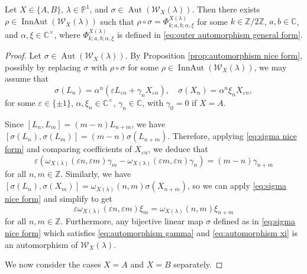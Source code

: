 \documentclass[10pt,a4paper]{amsart}
\DeclareMathOperator{\Aut}{Aut}
\DeclareMathOperator{\InnAut}{InnAut}
\newcommand{\CC}{\mathbb{C}}
\newcommand{\PP}{\mathbb{P}}
\newcommand{\W}{\mathcal{W}}
\newcommand{\ZZ}{\mathbb{Z}}
\begin{document}
\begin{proposition}\label{prop:outer automorphisms}
    Let $X \in \{A,B\}$, $\lambda \in \PP^1$, and $\sigma \in \Aut(\W_X(\lambda))$. Then there exists $\rho \in \InnAut(\W_X(\lambda))$ such that $\rho \circ \sigma = \Phi_{k;a,b;\alpha,\xi}^{X(\lambda)}$ for some $k \in \ZZ/2\ZZ$, $a,b \in \CC$, and $\alpha, \xi \in \CC^\times$, where $\Phi_{k;a,b;\alpha,\xi}^{X(\lambda)}$ is defined in \eqref{eq:outer automorphism general form}.

\end{proposition}

\begin{proof}
    Let $\sigma \in \Aut(\W_X(\lambda))$. By Proposition \ref{prop:automorphism nice form}, possibly by replacing $\sigma$ with $\rho \circ \sigma$ for some $\rho \in \InnAut(\W_X(\lambda))$, we may assume that
    \begin{equation}\label{eq:sigma nice form}
        \sigma(L_n) = \alpha^n (\varepsilon L_{\varepsilon n} + \gamma_n X_{\varepsilon n}), \quad \sigma(X_n) = \alpha^n \xi_n X_{\varepsilon n},
    \end{equation}
    for some $\varepsilon \in \{\pm 1\}$, $\alpha, \xi_n \in \CC^\times$, $\gamma_n \in \CC$, with $\gamma_0 = 0$ if $X = A$.

    Since $[L_n,L_m] = (m - n)L_{n+m}$, we have $[\sigma(L_n),\sigma(L_m)] = (m - n)\sigma(L_{n+m})$. Therefore, applying \eqref{eq:sigma nice form} and comparing coefficients of $X_{\varepsilon n}$, we deduce that
    \begin{equation}\label{eq:automorphism gamma}
        \varepsilon(\omega_{X(\lambda)}(\varepsilon n, \varepsilon m)\gamma_m - \omega_{X(\lambda)}(\varepsilon m, \varepsilon n)\gamma_n) = (m - n)\gamma_{n+m}
    \end{equation}
    for all $n,m \in \ZZ$. Similarly, we have $[\sigma(L_n),\sigma(X_m)] = \omega_{X(\lambda)}(n,m)\sigma(X_{n+m})$, so we can apply \eqref{eq:sigma nice form} and simplify to get
    \begin{equation}\label{eq:automorphism xi}
        \varepsilon \omega_{X(\lambda)}(\varepsilon n, \varepsilon m)\xi_m = \omega_{X(\lambda)}(n,m)\xi_{n+m}
    \end{equation}
    for all $n,m \in \ZZ$. Furthermore, any bijective linear map $\sigma$ defined as in \eqref{eq:sigma nice form} which satisfies \eqref{eq:automorphism gamma} and \eqref{eq:automorphism xi} is an automorphism of $\W_X(\lambda)$.
    
    We now consider the cases $X = A$ and $X = B$ separately.


\end{proof}
\end{document}
